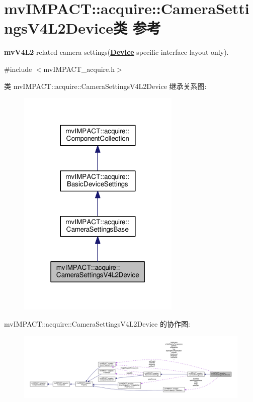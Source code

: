 \hypertarget{classmv_i_m_p_a_c_t_1_1acquire_1_1_camera_settings_v4_l2_device}{\section{mv\+I\+M\+P\+A\+C\+T\+:\+:acquire\+:\+:Camera\+Settings\+V4\+L2\+Device类 参考}
\label{classmv_i_m_p_a_c_t_1_1acquire_1_1_camera_settings_v4_l2_device}
}


{\bfseries mv\+V4\+L2} related camera settings({\bfseries \hyperlink{classmv_i_m_p_a_c_t_1_1acquire_1_1_device}{Device}} specific interface layout only).  




{\ttfamily \#include $<$mv\+I\+M\+P\+A\+C\+T\+\_\+acquire.\+h$>$}



类 mv\+I\+M\+P\+A\+C\+T\+:\+:acquire\+:\+:Camera\+Settings\+V4\+L2\+Device 继承关系图\+:
\nopagebreak
\begin{figure}[H]
\begin{center}
\leavevmode
\includegraphics[width=220pt]{classmv_i_m_p_a_c_t_1_1acquire_1_1_camera_settings_v4_l2_device__inherit__graph}
\end{center}
\end{figure}


mv\+I\+M\+P\+A\+C\+T\+:\+:acquire\+:\+:Camera\+Settings\+V4\+L2\+Device 的协作图\+:
\nopagebreak
\begin{figure}[H]
\begin{center}
\leavevmode
\includegraphics[width=350pt]{classmv_i_m_p_a_c_t_1_1acquire_1_1_camera_settings_v4_l2_device__coll__graph}
\end{center}
\end{figure}
